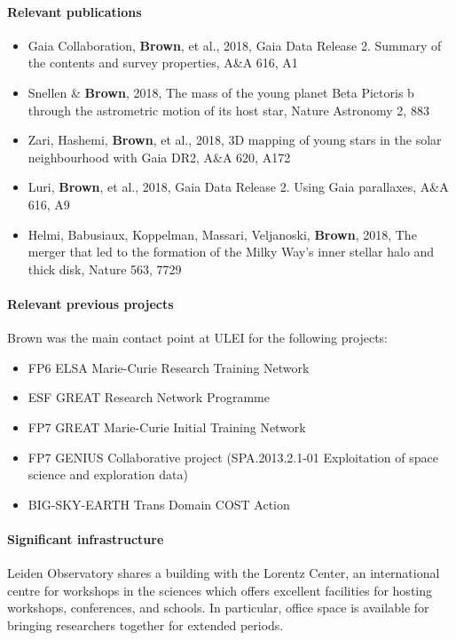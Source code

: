 \paragraph{Relevant publications}
\begin{itemize}
    \item Gaia Collaboration, \textbf{Brown}, et al., 2018, Gaia Data Release 2. Summary of the contents and survey properties, A\&A 616, A1 
    \item Snellen \& \textbf{Brown}, 2018, The mass of the young planet Beta Pictoris b through the astrometric motion of its host star, Nature Astronomy 2, 883 
    \item Zari, Hashemi, \textbf{Brown}, et al., 2018, 3D mapping of young stars in the solar neighbourhood with Gaia DR2, A\&A 620, A172 
    \item  Luri, \textbf{Brown}, et al., 2018, Gaia Data Release 2. Using Gaia parallaxes, A\&A 616, A9 
    \item Helmi, Babusiaux, Koppelman, Massari, Veljanoski, \textbf{Brown}, 2018, The merger that led to the formation of the Milky Way's inner stellar halo and thick disk, Nature 563, 7729 
\end{itemize}

\paragraph{Relevant previous projects}
Brown was the main contact point at ULEI for the following projects:
\begin{itemize}
    \item FP6 ELSA Marie-Curie Research Training Network
    \item ESF GREAT Research Network Programme 
    \item FP7 GREAT Marie-Curie Initial Training Network
    \item FP7 GENIUS Collaborative project (SPA.2013.2.1-01 Exploitation of space science and exploration data)
    \item BIG-SKY-EARTH Trans Domain COST Action
\end{itemize}

\paragraph{Significant infrastructure}
Leiden Observatory shares a building with the Lorentz Center, an international centre for workshops in the sciences which offers excellent facilities for hosting workshops, conferences, and schools. In particular, office space is available for bringing researchers together for extended periods.